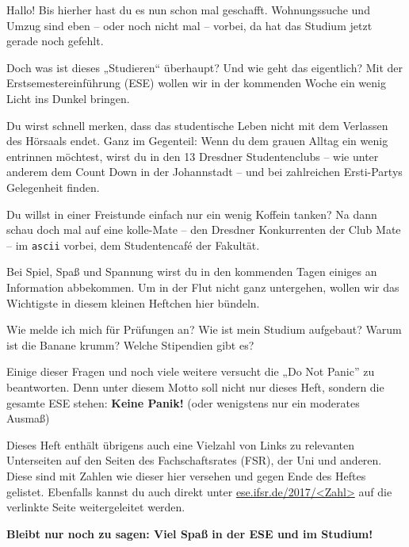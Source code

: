 

Hallo! Bis hierher hast du es nun schon mal geschafft. Wohnungssuche und Umzug sind eben -- oder noch nicht mal -- vorbei, da hat das Studium jetzt gerade noch gefehlt.

Doch was ist dieses „Studieren“ überhaupt? Und wie geht das eigentlich? Mit der Erstsemestereinführung (ESE) wollen wir in der kommenden Woche ein wenig Licht ins Dunkel bringen. 

Du wirst schnell merken, dass das studentische Leben nicht mit dem Verlassen des Hörsaals endet. Ganz im Gegenteil: Wenn du dem grauen Alltag ein wenig entrinnen möchtest, wirst du in den 13 Dresdner Studentenclubs -- wie unter anderem dem Count Down in der Johannstadt -- und bei zahlreichen Ersti-Partys Gelegenheit finden.

Du willst in einer Freistunde einfach nur ein wenig Koffein tanken? Na dann schau doch mal auf eine kolle-Mate -- den Dresdner Konkurrenten der Club Mate -- im \texttt{ascii} vorbei, dem Studentencafé der Fakultät.

Bei Spiel, Spaß und Spannung wirst du in den kommenden Tagen einiges an Information abbekommen. Um in der Flut nicht ganz untergehen, wollen wir das Wichtigste in diesem kleinen Heftchen hier bündeln.

Wie melde ich mich für Prüfungen an?  Wie ist mein Studium aufgebaut? Warum ist die Banane krumm? Welche Stipendien gibt es?

Einige dieser Fragen und noch viele weitere versucht die „Do Not Panic” zu beantworten. Denn unter diesem Motto soll nicht nur dieses Heft, sondern die gesamte ESE stehen: \textbf{Keine Panik!} (oder wenigstens nur ein moderates Ausmaß)

Dieses Heft enthält übrigens auch eine Vielzahl von Links zu relevanten Unterseiten auf den Seiten des Fachschaftsrates (FSR), der Uni und anderen.
Diese sind mit Zahlen wie dieser hier  versehen und gegen Ende des Heftes gelistet. Ebenfalls kannst du auch direkt unter \url{ese.ifsr.de/2017/<Zahl>} auf die verlinkte Seite weitergeleitet werden.

\textbf{Bleibt nur noch zu sagen: Viel Spaß in der ESE und im Studium!}